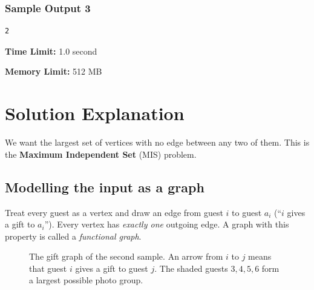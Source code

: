 \documentclass[11pt]{article}
\begin{document}
\subsubsection*{Sample Output 3}
\begin{verbatim}
2
\end{verbatim}

\noindent\textbf{Time Limit:} 1.0 second

\noindent\textbf{Memory Limit:} 512 MB


\newpage

\section*{Solution Explanation}

We want the largest set of vertices with no edge between any two of them. This is the \textbf{Maximum Independent Set} (MIS) problem.

\subsection*{Modelling the input as a graph}
Treat every guest as a vertex and draw an edge from guest $i$ to guest $a_i$ (``$i$ gives a gift to $a_i$''). Every vertex has \emph{exactly one} outgoing edge. A graph with this property is called a \emph{functional graph}.

\begin{figure}[h]
    \centering
    
    \caption{The gift graph of the second sample. An arrow from $i$ to $j$ means that guest $i$ gives a gift to guest $j$. The shaded
    guests $3, 4, 5, 6$ form a largest possible photo group.}
    \label{fig:sample2}
\end{figure}
\end{document}
